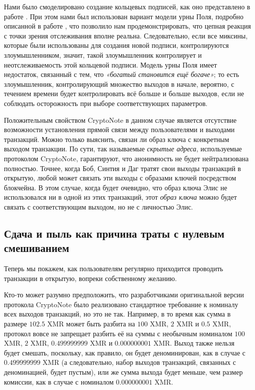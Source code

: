 \documentclass{mrl}
\begin{document}
Нами было смоделировано создание кольцевых подписей, как оно представлено в работе \cite{chainReactions}. При этом нами был использован вариант модели урны Поля, подробно описанной в работе \cite{johnson1977urn}, что позволило нам продемонстрировать, что цепная реакция с точки зрения отслеживания вполне реальна. Следовательно, если все миксины, которые были использованы для создания новой подписи, контролируются злоумышленником, значит, такой злоумышленник контролирует и неотслеживаемость этой кольцевой подписи. Модель урны Поля имеет недостаток, связанный с тем, что \textit{«богатый становится ещё богаче»}; то есть злоумышленник, контролирующий множество выходов в начале, вероятно, с течением времени будет контролировать всё больше и больше выходов, если не соблюдать осторожность при выборе соответствующих параметров.

Положительным свойством CryptoNote в данном случае является отсутствие возможности установления прямой связи между пользователями и выходами транзакций. Можно только выяснить, связан ли образ ключа с конкретным выходом транзакции. По сути, так называемые \textit{скрытые адреса}, используемые протоколом CryptoNote, гарантируют, что анонимность не будет нейтрализована полностью. Точнее, когда Боб, Синтия и Даг тратят свои выходы транзакций в открытую, любой может связать эти выходы с образами ключей посредством блокчейна. В этом случае, когда будет очевидно, что образ ключа Элис не использовался ни в одной из этих транзакций, этот \textit{образ ключа} можно будет связать с соответствующим выходом, но не с личностью Элис.

\subsection{Сдача и пыль как причина траты с нулевым смешиванием}\label{changeAndDust}

Теперь мы покажем, как пользователям регулярно приходится проводить транзакции в открытую, вопреки собственному желанию.

Кто-то может разумно предположить, что разработчиками оригинальной версии протокола \linebreak CryptoNote было реализовано стандартное требование к номиналу всех выходов транзакций, но это не так. Например, в то время как сумма в размере $102.5$ XMR может быть разбита на $100$ XMR, $2$ XMR и $0.5$ XMR, протокол вовсе не запрещает разбить её на суммы с необычным номиналом $100$ XMR, $2$ XMR, $0.499999999$ XMR и $0.000000001$ XMR. Выход также нельзя будет смешать, поскольку, как правило, он будет деноминирован, как в случае с $0.499999999$ XMR (а следовательно, набор выходов транзакций, связанных с деноминацией, будет пустым), или же сумма выхода будет меньше, чем размер комиссии, как в случае с номиналом $0.000000001$ XMR.
\end{document}
